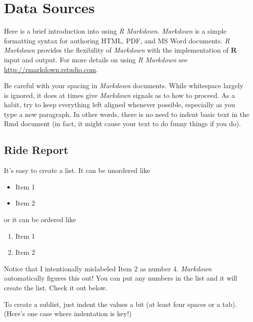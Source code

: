 \documentclass[12pt,twoside]{reedthesis}
\begin{document}
  \chapter{Data Sources}\label{rmd-basics}
  
  Here is a brief introduction into using \emph{R Markdown}.
  \emph{Markdown} is a simple formatting syntax for authoring HTML, PDF,
  and MS Word documents. \emph{R Markdown} provides the flexibility of
  \emph{Markdown} with the implementation of \textbf{R} input and output.
  For more details on using \emph{R Markdown} see
  \url{http://rmarkdown.rstudio.com}.
  
  Be careful with your spacing in \emph{Markdown} documents. While
  whitespace largely is ignored, it does at times give \emph{Markdown}
  signals as to how to proceed. As a habit, try to keep everything left
  aligned whenever possible, especially as you type a new paragraph. In
  other words, there is no need to indent basic text in the Rmd document
  (in fact, it might cause your text to do funny things if you do).
  
  \section{Ride Report}\label{ride-report}
  
  It's easy to create a list. It can be unordered like
  
  \begin{itemize}
  \itemsep1pt\parskip0pt
  \item
    Item 1
  \item
    Item 2
  \end{itemize}
  
  or it can be ordered like
  
  \begin{enumerate}
  \def\labelenumi{\arabic{enumi}.}
  \itemsep1pt\parskip0pt
  \item
    Item 1
  \item
    Item 2
  \end{enumerate}
  
  Notice that I intentionally mislabeled Item 2 as number 4.
  \emph{Markdown} automatically figures this out! You can put any numbers
  in the list and it will create the list. Check it out below.
  
  To create a sublist, just indent the values a bit (at least four spaces
  or a tab). (Here's one case where indentation is key!)
  
\end{document}
